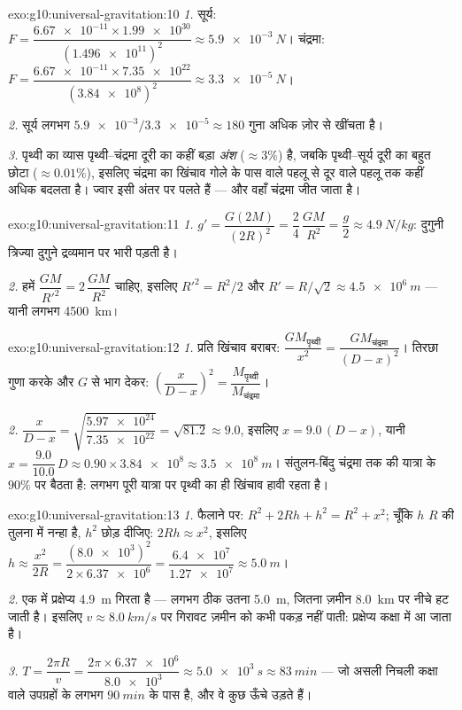 \begin{solution}{exo:g10:universal-gravitation:10}
\emph{1.} सूर्य: $F = \dfrac{\num{6.67e-11} \times \num{1.99e30}}{(\num{1.496e11})^2}
\approx \qty{5.9e-3}{N}$। चंद्रमा: $F = \dfrac{\num{6.67e-11} \times \num{7.35e22}}{(\num{3.84e8})^2}
\approx \qty{3.3e-5}{N}$।

\emph{2.} सूर्य लगभग $\num{5.9e-3}/\num{3.3e-5} \approx 180$ गुना अधिक ज़ोर से खींचता है।

\emph{3.} पृथ्वी का व्यास पृथ्वी--चंद्रमा दूरी का कहीं बड़ा \emph{अंश}
($\approx 3\%$) है, जबकि पृथ्वी--सूर्य दूरी का बहुत छोटा ($\approx 0.01\%$), इसलिए
चंद्रमा का खिंचाव गोले के पास वाले पहलू से दूर वाले पहलू तक कहीं अधिक
बदलता है। ज्वार इसी अंतर पर पलते हैं --- और वहाँ चंद्रमा जीत जाता है।
\end{solution}

\begin{solution}{exo:g10:universal-gravitation:11}
\emph{1.} $g' = \dfrac{G (2M)}{(2R)^2} = \dfrac{2}{4}\,\dfrac{GM}{R^2}
= \dfrac{g}{2} \approx \qty{4.9}{N/kg}$: दुगुनी त्रिज्या दुगुने द्रव्यमान पर भारी पड़ती है।

\emph{2.} हमें $\dfrac{GM}{R'^2} = 2\,\dfrac{GM}{R^2}$ चाहिए, इसलिए $R'^2 = R^2/2$ और $R' = R/\sqrt{2} \approx \qty{4.5e6}{m}$ --- यानी लगभग
\qty{4500}{km}।
\end{solution}

\begin{solution}{exo:g10:universal-gravitation:12}
\emph{1.} प्रति  खिंचाव बराबर: $\dfrac{G M_{\text{पृथ्वी}}}{x^2} = \dfrac{G M_{\text{चंद्रमा}}}{(D-x)^2}$। तिरछा गुणा करके
और $G$ से भाग देकर: $\left(\dfrac{x}{D-x}\right)^2 = \dfrac{M_{\text{पृथ्वी}}}{M_{\text{चंद्रमा}}}$।

\emph{2.} $\dfrac{x}{D-x}
= \sqrt{\dfrac{\num{5.97e24}}{\num{7.35e22}}} = \sqrt{81.2} \approx
9.0$, इसलिए $x = 9.0\,(D - x)$, यानी $x = \dfrac{9.0}{10.0}\,D
\approx 0.90 \times \num{3.84e8} \approx \qty{3.5e8}{m}$। संतुलन-बिंदु चंद्रमा तक की
यात्रा के $90\%$ पर बैठता है: लगभग पूरी यात्रा पर पृथ्वी का ही खिंचाव
हावी रहता है।
\end{solution}

\begin{solution}{exo:g10:universal-gravitation:13}
\emph{1.} फैलाने पर: $R^2 + 2Rh + h^2 = R^2 + x^2$; चूँकि $h$ $R$ की तुलना में नन्हा है,
$h^2$ छोड़ दीजिए: $2Rh \approx x^2$, इसलिए $h \approx \dfrac{x^2}{2R}
= \dfrac{(\num{8.0e3})^2}{2 \times \num{6.37e6}}
= \dfrac{\num{6.4e7}}{\num{1.27e7}} \approx \qty{5.0}{m}$।

\emph{2.} एक  में प्रक्षेप्य \qty{4.9}{m} गिरता है --- लगभग ठीक उतना
\qty{5.0}{m}, जितना ज़मीन \qty{8.0}{km} पर नीचे हट जाती है। इसलिए $v \approx \qty{8.0}{km/s}$ पर गिरावट
ज़मीन को कभी पकड़ नहीं पाती: प्रक्षेप्य कक्षा में आ जाता है।

\emph{3.} $T = \dfrac{2\pi R}{v}
= \dfrac{2\pi \times \num{6.37e6}}{\num{8.0e3}}
\approx \qty{5.0e3}{s} \approx \qty{83}{min}$ --- जो असली निचली कक्षा वाले उपग्रहों
के लगभग $\qty{90}{min}$ के पास है, और वे कुछ ऊँचे उड़ते हैं।
\end{solution}

